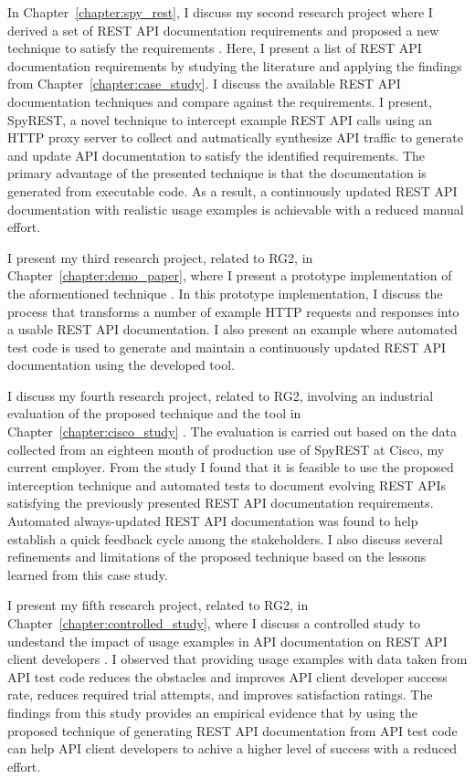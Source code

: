 In Chapter~\ref{chapter:spy_rest}, I discuss my second research project where I derived a set of REST API documentation requirements and proposed a new technique to satisfy the requirements \cite{sohan2015spyrest}. Here, I present a list of REST API documentation requirements by studying the literature and applying the findings from Chapter~\ref{chapter:case_study}. I discuss the available REST API documentation techniques and compare against the requirements. I present, SpyREST, a novel technique to intercept example REST API calls using an HTTP proxy server to collect and autmatically synthesize API traffic to generate and update API documentation to satisfy the identified requirements. The primary advantage of the presented technique is that the documentation is generated from executable code. As a result, a continuously updated REST API documentation with realistic usage examples is achievable with a reduced manual effort.

I present my third research project, related to RG2, in Chapter~\ref{chapter:demo_paper}, where I present a prototype implementation of the aformentioned technique \cite{sohan2015spyrest_tool}. In this prototype implementation, I discuss the process that transforms a number of example HTTP requests and responses into a usable REST API documentation. I also present an example where automated test code is used to generate and maintain a continuously updated REST API documentation using the developed tool.

I discuss my fourth research project, related to RG2, involving an industrial evaluation of the proposed technique and the tool in Chapter~\ref{chapter:cisco_study} \cite{sohan_cisco}. The evaluation is carried out based on the data collected from an eighteen month of production use of SpyREST at Cisco, my current employer. From the study I found that it is feasible to use the proposed interception technique and automated tests to document evolving REST APIs satisfying the previously presented REST API documentation requirements. Automated always-updated REST API documentation was found to help establish a quick feedback cycle among the stakeholders. I also discuss several refinements and limitations of the proposed technique based on the lessons learned from this case study.

I present my fifth research project, related to RG2, in Chapter~\ref{chapter:controlled_study}, where I discuss a controlled study to undestand the impact of usage examples in API documentation on REST API client developers \cite{sohan_vlhcc}. I observed that providing usage examples with data taken from API test code reduces the obstacles and improves API client developer success rate, reduces required trial attempts, and improves satisfaction ratings. The findings from this study provides an empirical evidence that by using the proposed technique of generating REST API documentation from API test code can help API client developers to achive a higher level of success with a reduced effort.

